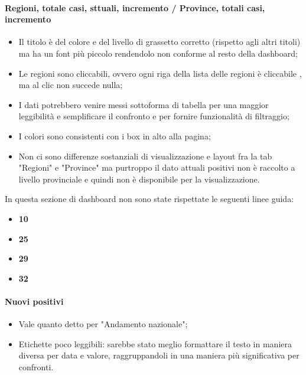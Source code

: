 \paragraph{Regioni, totale casi, sttuali, incremento / Province, totali casi, incremento}
\begin{itemize}
    \item Il titolo è del colore e del livello di grassetto corretto (rispetto agli altri titoli) ma ha un font più piccolo rendendolo non conforme al resto della dashboard;
    \item Le regioni sono cliccabili, ovvero ogni riga della lista delle regioni è cliccabile , ma al clic non succede nulla;
    \item I dati potrebbero venire messi sottoforma di tabella  per una maggior leggibilità e semplificare il confronto e per fornire funzionalità di filtraggio;
    \item I colori sono consistenti con i box in alto alla pagina;
    \item Non ci sono differenze sostanziali di visualizzazione e layout fra la tab "Regioni" e "Province" ma purtroppo il dato attuali positivi non è raccolto a livello provinciale e quindi non è disponibile per la visualizzazione.
\end{itemize}
In questa sezione di dashboard non sono state rispettate le seguenti linee guida:
\begin{itemize}
    \item \textbf{10}
    \item \textbf{25}
    \item \textbf{29}
    \item \textbf{32}
\end{itemize}
\paragraph{Nuovi positivi}
\begin{itemize}
        \item Vale quanto detto per "Andamento nazionale";
        \item Etichette poco leggibili: sarebbe stato meglio formattare il testo in maniera diversa per data e valore, raggruppandoli in una maniera più significativa per confronti.
\end{itemize}

